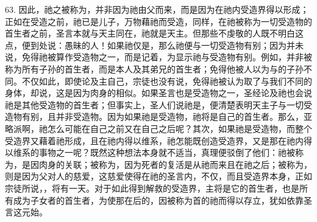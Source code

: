 63. 因此，祂之被称为，并非因为祂由父而来，而是因为在祂内受造界得以形成；正如在受造之前，祂已是儿子，万物藉祂而受造，同样，在祂被称为一切受造物的首生者之前，圣言本就与天主同在，祂就是天主。但那些不虔敬的人既不明白这点，便到处说：愚昧的人！如果祂仅是，那么祂便与一切受造物有别；因为并未说，免得祂被算作受造物之一，而是记着，为显示祂与受造物有别。例如，并非被称为所有子孙的首生者，而是本人及其弟兄的首生者；免得他被人以为与的子孙不同。不仅如此，即使论及主自己，宗徒也没有说，免得祂被认为取了与我们不同的身体，却说，这是因为肉身的相似。如果圣言也是受造物之一，圣经论及祂也会说祂是其他受造物的首生者；但事实上，圣人们说祂是，便清楚表明天主子与一切受造物有别，且并非受造物。因为如果祂是受造物，祂将是自己的首生者。那么，亚略派啊，祂怎么可能在自己之前又在自己之后呢？其次，如果祂是受造物，而整个受造界又藉着祂形成，且在祂内得以维系，祂怎能既创造受造界，又是那在祂内得以维系的事物之一呢？既然这种想法本身就不适当，真理便驳倒了他们：祂被称为，是因肉身的关联；被称为，因为死者的复活是从祂而来且在祂之后；被称为，则是因为父对人的慈爱，这慈爱使得在祂的圣言内，不仅，而且受造界本身，正如宗徒所说，，将有一天。对于如此得到解救的受造界，主将是它的首生者，也是所有成为子女者的首生者，为使那在后的，因被称为首的祂而得以存立，犹如依靠圣言这元始。\par

